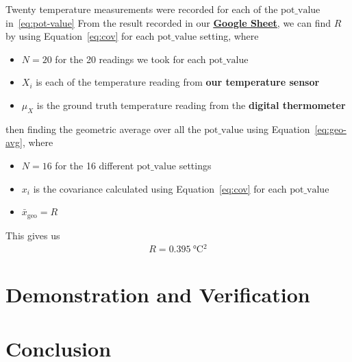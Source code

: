 \documentclass[12pt,a4paper]{article}
\begin{document}
Twenty temperature measurements were recorded for each of the $\text{pot\_value}$ in~\eqref{eq:pot-value}
From the result recorded in our \href{https://docs.google.com/spreadsheets/d/1mIqAQL7zom7rqrgY63SVOOFBYus10Tk0CKpmR08Oij0/edit?gid=501799072#gid=501799072}{\textbf{\underline{Google Sheet}}}, we can find $R$ by using Equation~\eqref{eq:cov} for each $\text{pot\_value}$ setting, where

\begin{itemize}
    \item $N=20$ for the 20 readings we took for each $\text{pot\_value}$
    \item $X_i$ is each of the temperature reading from \textbf{our temperature sensor}
    \item $\mu_X$ is the ground truth temperature reading from the \textbf{digital thermometer}
\end{itemize}
then finding the geometric average over all the $\text{pot\_value}$ using Equation~\eqref{eq:geo-avg}, where
\begin{itemize}
    \item $N=16$ for the 16 different $\text{pot\_value}$ settings
    \item $x_i$ is the covariance calculated using Equation~\eqref{eq:cov} for each $\text{pot\_value}$
    \item $\bar{x}_{\mathrm{geo}}=R$
\end{itemize}
This gives us
\begin{align*}
    R = \SI{0.395}{\degreeCelsius^2}
\end{align*}

\section{Demonstration and Verification}

\section{Conclusion}


\newpage


\end{document}
